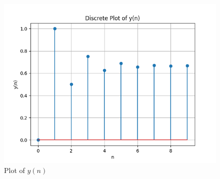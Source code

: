 \documentclass[journal,12pt,twocolumn]{IEEEtran}
\theoremstyle{remark}
\begin{document}
\begin{figure}[ht!]
	\includegraphics[width=\columnwidth]{plots/plot-file.png}
	\caption{Plot of $y(n)$}
	\label{fig:1.2}
\end{figure}
\end{document}
